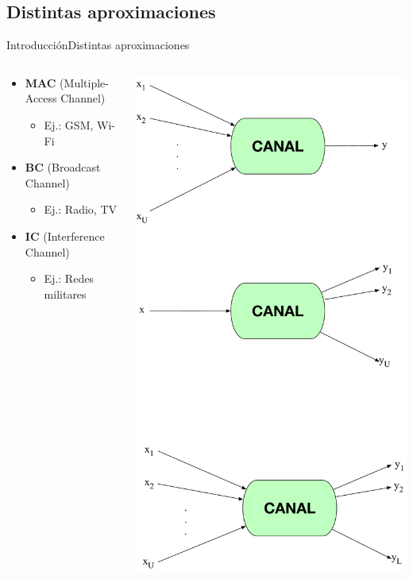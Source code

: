 \documentclass[10pt,compress]{beamer} %
\begin{document}
\subsection{Distintas aproximaciones}
\begin{frame}{Introducción}{Distintas aproximaciones}
  \begin{columns}[onlytextwidth]
    \begin{column}{.5\textwidth}
      \begin{itemize}
        \item {\bf MAC} (Multiple-Access Channel)
        \begin{itemize}
          \item Ej.: GSM, Wi-Fi
        \end{itemize}
        \vspace{1cm}
        \item {\bf BC} (Broadcast Channel)
        \begin{itemize}
          \item Ej.: Radio, TV
        \end{itemize}
        \vspace{1cm}
        \item {\bf IC} (Interference Channel)
        \begin{itemize}
          \item Ej.: Redes militares
        \end{itemize}
      \end{itemize}
    \end{column}
    \begin{column}{.5\textwidth}
      \includegraphics[width=0.6\linewidth]{Figuras/ModosDeAcceso.pdf}
    \end{column}
  \end{columns}
\end{frame}
\end{document}
